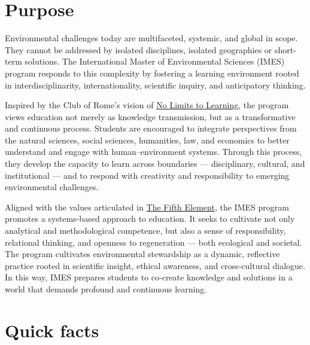 \documentclass[
  letterpaper,
  10pt,
  openany]{book}
\begin{document}

\section*{Purpose}\label{purpose}


Environmental challenges today are multifaceted, systemic, and global in
scope. They cannot be addressed by isolated disciplines, isolated
geographies or short-term solutions. The International Master of
Environmental Sciences (IMES) program responds to this complexity by
fostering a learning environment rooted in interdisciplinarity,
internationality, scientific inquiry, and anticipatory thinking.

Inspired by the Club of Rome's vision of
\href{https://www.clubofrome.org/blog-post/bologna-qa-legacy-of-no-limits-to-learning/}{No
Limits to Learning}, the program views education not merely as knowledge
transmission, but as a transformative and continuous process. Students
are encouraged to integrate perspectives from the natural sciences,
social sciences, humanities, law, and economics to better understand and
engage with human--environment systems. Through this process, they
develop the capacity to learn across boundaries --- disciplinary,
cultural, and institutional --- and to respond with creativity and
responsibility to emerging environmental challenges.

Aligned with the values articulated in
\href{https://thefifthelement.earth/}{The Fifth Element}, the IMES
program promotes a systems-based approach to education. It seeks to
cultivate not only analytical and methodological competence, but also a
sense of responsibility, relational thinking, and openness to
regeneration --- both ecological and societal. The program cultivates
environmental stewardship as a dynamic, reflective practice rooted in
scientific insight, ethical awareness, and cross-cultural dialogue. In
this way, IMES prepares students to co-create knowledge and solutions in
a world that demands profound and continuous learning.

\section*{Quick facts}\label{quick-facts}
\end{document}
